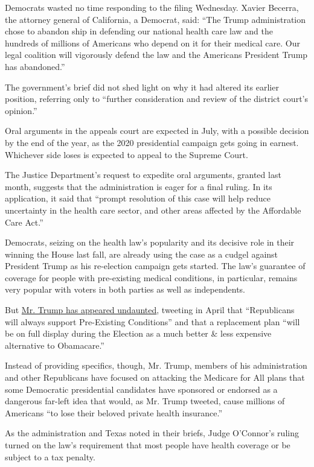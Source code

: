 Democrats wasted no time responding to the filing Wednesday. Xavier
Becerra, the attorney general of California, a Democrat, said: ``The
Trump administration chose to abandon ship in defending our national
health care law and the hundreds of millions of Americans who depend on
it for their medical care. Our legal coalition will vigorously defend
the law and the Americans President Trump has abandoned.''

The government's brief did not shed light on why it had altered its
earlier position, referring only to ``further consideration and review
of the district court's opinion.''

Oral arguments in the appeals court are expected in July, with a
possible decision by the end of the year, as the 2020 presidential
campaign gets going in earnest. Whichever side loses is expected to
appeal to the Supreme Court.

The Justice Department's request to expedite oral arguments, granted
last month, suggests that the administration is eager for a final
ruling. In its application, it said that ``prompt resolution of this
case will help reduce uncertainty in the health care sector, and other
areas affected by the Affordable Care Act.''

Democrats, seizing on the health law's popularity and its decisive role
in their winning the House last fall, are already using the case as a
cudgel against President Trump as his re-election campaign gets started.
The law's guarantee of coverage for people with pre-existing medical
conditions, in particular, remains very popular with voters in both
parties as well as independents.

But
\href{https://www.nytimes.com/2019/03/27/us/politics/trump-aca.html}{Mr.
Trump has appeared undaunted}, tweeting in April that ``Republicans will
always support Pre-Existing Conditions'' and that a replacement plan
``will be on full display during the Election as a much better \& less
expensive alternative to Obamacare.''

Instead of providing specifics, though, Mr. Trump, members of his
administration and other Republicans have focused on attacking the
Medicare for All plans that some Democratic presidential candidates have
sponsored or endorsed as a dangerous far-left idea that would, as Mr.
Trump tweeted, cause millions of Americans ``to lose their beloved
private health insurance.''

As the administration and Texas noted in their briefs, Judge O'Connor's
ruling turned on the law's requirement that most people have health
coverage or be subject to a tax penalty.

